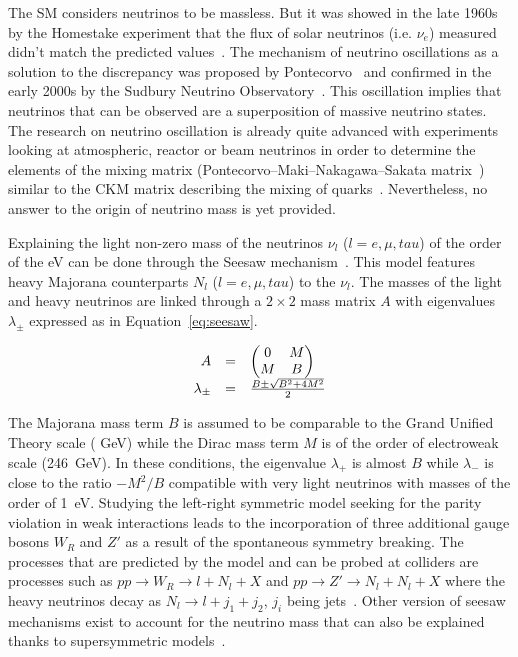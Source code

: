 	The SM considers neutrinos to be massless. But it was showed in the late 1960s by the Homestake experiment that the flux of solar neutrinos (i.e. $\nu_e$) measured didn't match the predicted values~\cite{DAVIS1968}. The mechanism of neutrino oscillations as a solution to the discrepancy was proposed by Pontecorvo~\cite{PONTECORVO1968} and confirmed in the early 2000s by the Sudbury Neutrino Observatory~\cite{SNO2002}. This oscillation implies that neutrinos that can be observed are a superposition of massive neutrino states. The research on neutrino oscillation is already quite advanced with experiments looking at atmospheric, reactor or beam neutrinos in order to determine the elements of the mixing matrix (Pontecorvo–Maki–Nakagawa–Sakata matrix~\cite{MNS1962}) similar to the \acf{CKM} matrix describing the mixing of quarks~\cite{KOBAYASHI1973}. Nevertheless, no answer to the origin of neutrino mass is yet provided.
	
	Explaining the light non-zero mass of the neutrinos $\nu_l$ ($l = e,\mu,tau$) of the order of the \si{eV} can be done through the Seesaw mechanism~\cite{MINKOWSKI1977,MOHAPATRA1980}. This model features heavy Majorana counterparts $N_l$ ($l = e,\mu,tau$) to the $\nu_l$. The masses of the light and heavy neutrinos are linked through a $2 \times 2$ mass matrix $A$ with eigenvalues $\lambda_{\pm}$ expressed as in Equation~\ref{eq:seesaw}.
	
	\begin{equation}
		\label{eq:seesaw}
		\begin{array}{r c l}
			A & = & \begin{pmatrix}
				0 & M \\
				M & B \\
				\end{pmatrix}\\
			\lambda_{\pm} & = & \frac{B \pm \sqrt{B^2 + 4M^2}}{2}\\
		\end{array}
	\end{equation}
	
	The Majorana mass term $B$ is assumed to be comparable to the Grand Unified Theory scale ( \si{GeV}) while the Dirac mass term $M$ is of the order of electroweak scale (\SI{246}{GeV}). In these conditions, the eigenvalue $\lambda_+$ is almost $B$ while $\lambda_-$ is close to the ratio $-M^2/B$ compatible with very light neutrinos with masses of the order of \SI{1}{eV}. Studying the left-right symmetric model seeking for the parity violation in weak interactions leads to the incorporation of three additional gauge bosons $W_R$ and $Z'$ as a result of the spontaneous symmetry breaking. The processes that are predicted by the model and can be probed at colliders are processes such as $pp \rightarrow W_R \rightarrow l + N_l + X$ and $pp \rightarrow Z' \rightarrow N_l + N_l + X$ where the heavy neutrinos decay as $N_l \rightarrow l + j_1 + j_2$, $j_i$ being jets~\cite{CMSPHYSICSTDR2}. Other version of seesaw mechanisms exist to account for the neutrino mass that can also be explained thanks to supersymmetric models~\cite{VALLE2006}.
	
